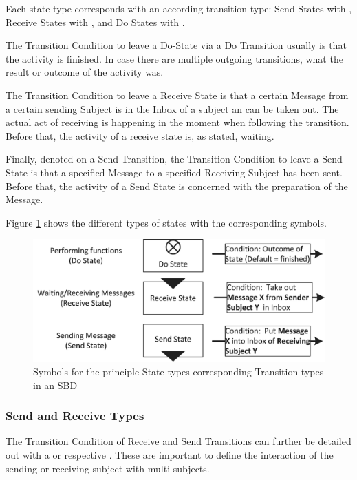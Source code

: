 Each state type corresponds with an according transition type: Send States with , Receive States with , and Do States with . 

The Transition Condition to leave a Do-State via a Do Transition usually is that the activity is finished. In case there are multiple outgoing transitions, what the result or outcome of the activity was.

The Transition Condition to leave a Receive State is that a certain Message from a certain sending Subject is in the Inbox of a subject an can be taken out. The actual act of receiving is happening in the moment when following the transition. Before that, the activity of a receive state is, as stated, waiting. 

Finally, denoted on a Send Transition, the Transition Condition to leave a Send State is that a specified Message to a specified Receiving Subject has been sent. Before that, the activity of a Send State is concerned with the preparation of the Message. 

Figure \ref{fig:behavior-symbole} shows the different types of states with the corresponding symbols.

\begin{figure}[htbp]
	\centering
	\includegraphics[width=0.9\linewidth]{Figures/Ontology/SubjectBehavior/Behavior-Symbole_NEW2.png}
	\caption[Symbols for the principle State types and corresponding Transition types in an SBD]{Symbols for the principle State types corresponding Transition types in an SBD}
	\label{fig:behavior-symbole}
\end{figure}

\subsubsection{Send and Receive Types}
\label{sec:sendAndReceiveTypes}

The Transition Condition of Receive and Send Transitions can further be detailed out with a  or respective . These are important to define the interaction of the sending or receiving subject with multi-subjects.

